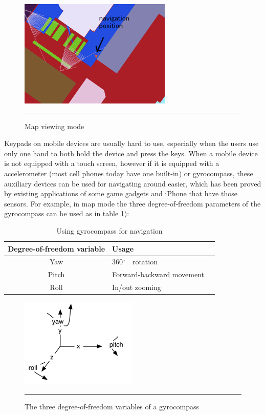 \begin{figure}[htbp]
	\centering
	\includegraphics{./Primitives/map_mode.png}
	\rule{35em}{0.5pt}
	\caption[Map viewing mode]{Map viewing mode}
	\label{fig:MapMode}
\end{figure}

Keypads on mobile devices are usually hard to use, especially when the users use only one hand to both hold the device and press the keys. When a mobile device is not equipped with a touch screen, however if it is equipped with a accelerometer (most cell phones today have one built-in) or gyrocompass, these auxiliary devices can be used for navigating around easier, which has been proved by existing applications of some game gadgets and iPhone that have those sensors. For example, in map mode the three degree-of-freedom parameters of the gyrocompass can be used as in table \ref{tb:GyrocompassNavigation}):

\begin{table}[tb]
	\begin{center}
		\caption{Using gyrocompass for navigation}
		\label{tb:GyrocompassNavigation}
		\begin{tabular}{|c|l|l|}
			\hline
			Degree-of-freedom variable & Usage                     \\
			\hline
			Yaw                        & 360$^\circ$　rotation      \\
			Pitch                      & Forward-backward movement \\
			Roll                       & In/out zooming            \\
			\hline
		\end{tabular}
	\end{center}
\end{table}

\begin{figure}[htbp]
	\centering
	\includegraphics{./Primitives/yaw_pitch_roll.png}
	\rule{35em}{0.5pt}
	\caption[The three degree-of-freedom variables of a gyrocompass]{The three degree-of-freedom variables of a gyrocompass}
	\label{fig:YawPitchRoll}
\end{figure}
